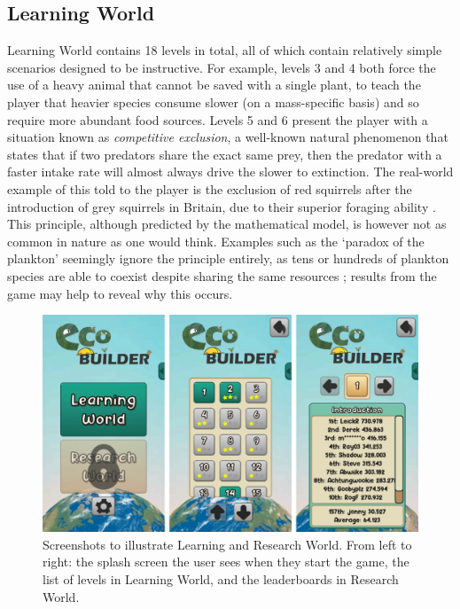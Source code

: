 \subsection{Learning World}
\label{sec:learning_world}
Learning World contains 18 levels in total, all of which contain relatively simple scenarios designed to be instructive. For example, levels 3 and 4 both force the use of a heavy animal that cannot be saved with a single plant, to teach the player that heavier species consume slower (on a mass-specific basis) and so require more abundant food sources. Levels 5 and 6 present the player with a situation known as \emph{competitive exclusion}, a well-known natural phenomenon that states that if two predators share the exact same prey, then the predator with a faster intake rate will almost always drive the slower to extinction.
The real-world example of this told to the player is the exclusion of red squirrels after the introduction of grey squirrels in Britain, due to their superior foraging ability \citep{Gurnell2004}.
This principle, although predicted by the mathematical model, is however not as common in nature as one would think. Examples such as the `paradox of the plankton' seemingly ignore the principle entirely, as tens or hundreds of plankton species are able to coexist despite sharing the same resources \citep{Hutchinson1961}; results from the game may help to reveal why this occurs.

\begin{figure}
    \centering
    \includegraphics[width=\textwidth]{joy/worlds.png}
    \caption[Learning World and Research World]{Screenshots to illustrate Learning and Research World. From left to right: the splash screen the user sees when they start the game, the list of levels in Learning World, and the leaderboards in Research World.}
    \label{fig:eco_worlds}
\end{figure}


